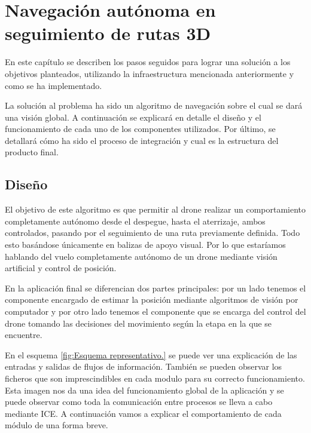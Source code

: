 \chapter{Navegación autónoma en seguimiento de rutas 3D}\label{cap.desarrollo}
\hspace{1cm} En este capítulo se describen los pasos seguidos para lograr una solución a los objetivos planteados, utilizando la infraestructura mencionada anteriormente y como se ha implementado.

\hspace{1cm} La solución al problema ha sido un algoritmo de navegación sobre el cual se dará una visión global. A continuación se explicará en detalle el diseño y el funcionamiento de cada uno de los componentes utilizados. Por último, se detallará cómo ha sido el proceso de integración y cual es la estructura del producto final.


\section{Diseño}
\hspace{1cm} El objetivo de este algoritmo es que permitir al drone realizar un comportamiento completamente autónomo desde el despegue, hasta el aterrizaje, ambos controlados, pasando por el seguimiento de una ruta previamente definida. Todo esto basándose únicamente en balizas de apoyo visual. Por lo que estaríamos hablando del vuelo completamente autónomo de un drone mediante visión artificial y control de posición.

\hspace{1cm} En la aplicación final se diferencian dos partes principales: por un lado tenemos el componente encargado de estimar la posición mediante algoritmos de visión por computador y por otro lado tenemos el componente que se encarga del control del drone tomando las decisiones del movimiento según la etapa en la que se encuentre.

\hspace{1cm} En el esquema \ref{fig:Esquema representativo.} se puede ver una explicación de las entradas y salidas de flujos de información. También se pueden observar los ficheros que son imprescindibles en cada modulo para su correcto funcionamiento. Esta imagen nos da una idea del funcionamiento global de la aplicación y se puede observar como toda la comunicación entre procesos se lleva a cabo mediante ICE. A continuación vamos a explicar el comportamiento de cada módulo de una forma breve. 


